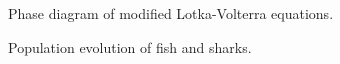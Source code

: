 \documentclass[aps,prl,preprint,superscriptaddress]{revtex4}
\begin{document}
\begin{figure}[H]
	\centering
	\caption{Phase diagram of modified Lotka-Volterra equations.}
	\label{more_clusters} 
\end{figure}

\begin{figure}[H]
	\centering
	\caption{Population evolution of fish and sharks.}
	\label{more_clusters} 
\end{figure}
\end{document}
